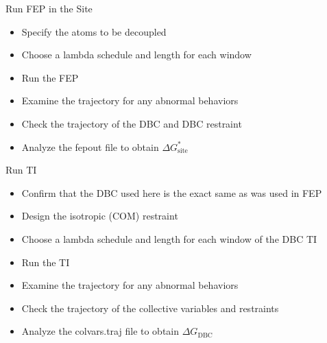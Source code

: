 \documentclass[9pt,tutorial]{Styling/livecoms}
\begin{document}
\begin{Checklists*}
\begin{checklist}{Run FEP in the Site}
\begin{itemize}
\item Specify the atoms to be decoupled
\item Choose a lambda schedule and length for each window
\item Run the FEP
\item Examine the trajectory for any abnormal behaviors
\item Check the trajectory of the DBC and DBC restraint
\item Analyze the fepout file to obtain $\Delta G^*_\mathrm{site}$
\end{itemize}
\end{checklist}

\begin{checklist}{Run TI}
\begin{itemize}
\item Confirm that the DBC used here is the exact same as was used in FEP
\item Design the isotropic (COM) restraint
\item Choose a lambda schedule and length for each window of the DBC TI
\item Run the TI
\item Examine the trajectory for any abnormal behaviors
\item Check the trajectory of the collective variables and restraints
\item Analyze the colvars.traj file to obtain $\Delta G_\mathrm{DBC}$
\end{itemize}
\end{checklist}
\end{Checklists*}
\end{document}
